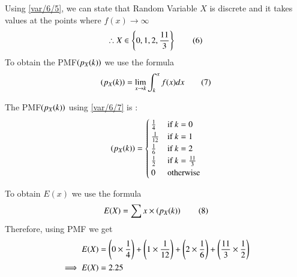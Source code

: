      Using \eqref{var/6/5}, we can state that Random Variable $X$ is discrete and it takes values at the points where $f(x) \to \infty$ \\
    \begin{align*}
    \therefore X \in \cbrak{0, 1, 2, \frac{11}{3}} \tag{6} \label{var/6/6}
    \end{align*}
    To obtain the PMF$\left(p_X(k)\right)$ we use the formula
    \begin{align*}
    \brak{p_X(k)} = 
    \lim_{x\to k}\int_{k}^{x}f(x)dx  
    \tag{7} \label{var/6/7}
    \end{align*}
    \begin{definition}
    \label{var/6/PMF}
     The PMF$\left(p_X(k)\right)$ using \eqref{var/6/7} is :
    \begin{align*}
    \left(p_X(k)\right)=
    \begin{cases}
    \frac{1}{4} & \text{if } k=0 \\
    \frac{1}{12} & \text{if } k=1 \\
    \frac{1}{6} & \text{if } k=2 \\
    \frac{1}{2} & \text{if } k=\frac{11}{3} \\
    0 & \text{otherwise}
    \end{cases}
    \end{align*}
    \end{definition}
    To obtain $E(x)$ we use the formula
    \begin{align*}
    E(X) = \sum  x\times \brak{p_X(k)} \label{var/6/8} \tag{8}
    \end{align*}
     Therefore, using PMF we get
    \begin{align*}
    E(X)& = \left(0\times \frac{1}{4}\right) + \left(1\times \frac{1}{12}\right) + \left(2\times \frac{1}{6}\right) + \left(\frac{11}{3}\times \frac{1}{2}\right) \\
    \implies E(X) &= 2.25
    \end{align*}